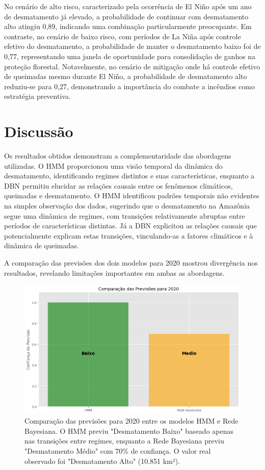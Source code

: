 \documentclass[12pt,a4paper]{article}
\begin{document}
No cenário de alto risco, caracterizado pela ocorrência de El Niño após um ano de desmatamento já elevado, a probabilidade de continuar com desmatamento alto atingiu 0,89, indicando uma combinação particularmente preocupante. Em contraste, no cenário de baixo risco, com períodos de La Niña após controle efetivo do desmatamento, a probabilidade de manter o desmatamento baixo foi de 0,77, representando uma janela de oportunidade para consolidação de ganhos na proteção florestal. Notavelmente, no cenário de mitigação onde há controle efetivo de queimadas mesmo durante El Niño, a probabilidade de desmatamento alto reduziu-se para 0,27, demonstrando a importância do combate a incêndios como estratégia preventiva.

\section{Discussão}

Os resultados obtidos demonstram a complementaridade das abordagens utilizadas. O HMM proporcionou uma visão temporal da dinâmica do desmatamento, identificando regimes distintos e suas características, enquanto a DBN permitiu elucidar as relações causais entre os fenômenos climáticos, queimadas e desmatamento. O HMM identificou padrões temporais não evidentes na simples observação dos dados, sugerindo que o desmatamento na Amazônia segue uma dinâmica de regimes, com transições relativamente abruptas entre períodos de características distintas. Já a DBN explicitou as relações causais que potencialmente explicam estas transições, vinculando-as a fatores climáticos e à dinâmica de queimadas.

A comparação das previsões dos dois modelos para 2020 mostrou divergência nos resultados, revelando limitações importantes em ambas as abordagens.

\begin{figure}[htbp]
    \centering
    \includegraphics[width=\textwidth]{img/output2.png}
    \caption{Comparação das previsões para 2020 entre os modelos HMM e Rede Bayesiana. O HMM previu "Desmatamento Baixo" baseado apenas nas transições entre regimes, enquanto a Rede Bayesiana previu "Desmatamento Médio" com 70\% de confiança. O valor real observado foi "Desmatamento Alto" (10.851 km²).}
    \label{fig:comparacao_previsao}
\end{figure}
\end{document}

